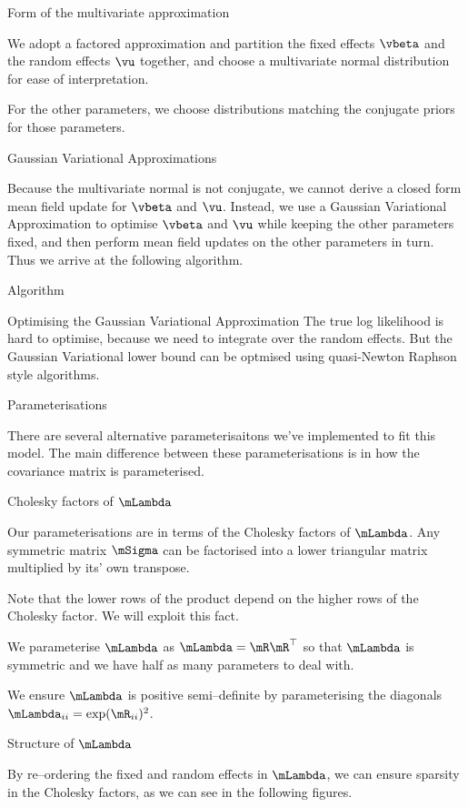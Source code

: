 \documentclass{amsart}
\begin{document}
Form of the multivariate approximation

We adopt a factored approximation and partition the fixed effects $\vbeta$ and the random effects $\vu$
together, and choose a multivariate normal distribution for ease of interpretation.

For the other parameters, we choose distributions matching the conjugate priors for those parameters.

Gaussian Variational Approximations

Because the multivariate normal is not conjugate, we cannot derive a closed form mean field update for
$\vbeta$ and $\vu$. Instead, we use a Gaussian Variational Approximation to optimise $\vbeta$ and $\vu$
while keeping the other parameters fixed, and then perform mean field updates on the other parameters in turn.
Thus we arrive at the following algorithm.

Algorithm

Optimising the Gaussian Variational Approximation
The true log likelihood is hard to optimise, because we need to integrate over the random effects. But the
Gaussian Variational lower bound can be optmised using quasi-Newton Raphson style algorithms.

Parameterisations

There are several alternative parameterisaitons we've implemented to fit this model. The main difference between
these parameterisations is in how the covariance matrix is parameterised.

Cholesky factors of $\mLambda$

Our parameterisations are in terms of the Cholesky factors of $\mLambda$. Any symmetric matrix $\mSigma$
can be factorised into a lower triangular matrix multiplied by its' own transpose.

Note that the lower rows of the product depend on the higher rows of the Cholesky factor. We will exploit this
fact.

We parameterise $\mLambda$ as $\mLambda = \mR \mR^\top$ so that $\mLambda$ is symmetric and we have half as
many parameters to deal with.

We ensure $\mLambda$ is positive semi--definite by parameterising the diagonals
$\mLambda_{ii} = \exp(\mR_{ii})^2$.

Structure of $\mLambda$

By re--ordering the fixed and random effects in $\mLambda$, we can ensure sparsity in the Cholesky factors,
as we can see in the following figures.
\end{document}

